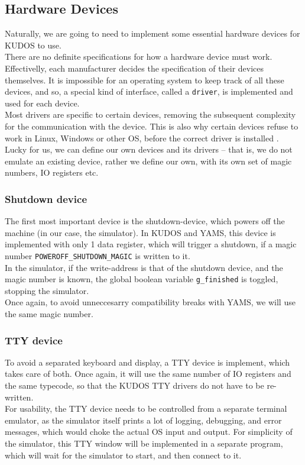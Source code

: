 \subsection{Hardware Devices}
Naturally, we are going to need to implement some essential hardware devices
for KUDOS to use.\\
There are no definite specifications for how a hardware device must work.
Effectivelly, each manufacturer decides the specification of their devices
themselves. It is impossible for an operating system to keep track of all these
devices, and so, a special kind of interface, called a \texttt{driver},
is implemented and used for each device.\\
Most drivers are specific to certain devices, removing the subsequent complexity
for the communication with the device. This is also why certain devices refuse
to work in Linux, Windows or other OS, before the correct driver is installed
\cite{microsoft:driver}.\\
Lucky for us, we can define our own devices and its drivers -- that is,
we do not emulate an existing device, rather we define our own, with its own
set of magic numbers, IO registers etc.


\subsubsection{Shutdown device}
The first most important device is the shutdown-device, which powers off the
machine (in our case, the simulator).
In KUDOS and YAMS, this device is implemented with only 1 data register, which
will trigger a shutdown, if a magic number \texttt{POWEROFF\_SHUTDOWN\_MAGIC} is
written to it\cite[drivers/metadev.h]{kudos}.\\
In the simulator, if the write-address is that of the shutdown device, and the
magic number is known, the global boolean variable \texttt{g\_finished} is
toggled, stopping the simulator.\\
Once again, to avoid unneccesarry compatibility breaks with YAMS, we will use
the same magic number.

\subsubsection{TTY device}
To avoid a separated keyboard and display, a TTY device is implement, which
takes care of both. Once again, it will use the same number of IO registers
and the same typecode, so that the KUDOS TTY drivers do not have to be
re-written.\\
For usability, the TTY device needs to be controlled from a separate terminal
emulator, as
the simulator itself prints a lot of logging, debugging, and error messages,
which would choke the actual OS input and output.
For simplicity of the simulator, this TTY window will be implemented in a
separate program, which will wait for the simulator to start, and then connect
to it.\\

